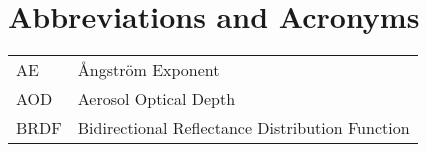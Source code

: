 \chapter{Abbreviations and Acronyms}

\begingroup
\onehalfspacing
\begin{center}
\begin{small}
\begin{longtable}{p{4em} p{31em} }
  AE   & Ångström Exponent \\
  AOD  & Aerosol Optical Depth \\
  BRDF & Bidirectional Reflectance Distribution Function \\
\end{longtable}
\end{small}
\end{center}
\endgroup
